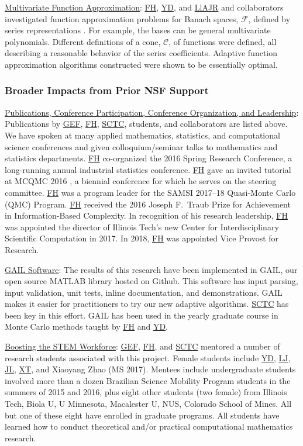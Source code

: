 \documentclass[11pt]{NSFamsart}
\newcommand{\Upara}[1]{\noindent\underline{#1}:\xspace}
\newcommand{\FH}{\hyperlink{FHlink}{FH}\xspace}
\newcommand{\SCTC}{\hyperlink{SCTClink}{SCTC}\xspace}
\newcommand{\GEF}{\hyperlink{GEFlink}{GEF}\xspace}
\newcommand{\YD}{\hyperlink{YDlink}{YD}\xspace}
\newcommand{\LlAJR}{\hyperlink{LlAJRlink}{LlAJR}\xspace}
\newcommand{\LJ}{\hyperlink{LJlink}{LJ}\xspace}
\newcommand{\XT}{\hyperlink{XTlink}{XT}\xspace}
\newcommand{\JL}{\hyperlink{JLlink}{JL}\xspace}
\newcommand{\GAIL}{GAIL\xspace}
\newcommand{\MATLAB}{MATLAB\xspace}
\newcommand{\Rlang}{R\xspace}
\newcommand{\calc}{{\mathcal{C}}}
\newcommand{\calf}{{\mathcal{F}}}
\begin{document}
\Upara{Multivariate Function Approximation}
\FH, \YD, and \LlAJR and collaborators investigated function approximation problems for Banach spaces, $\calf$, defined by series representations \cite{DinHic20a,DinEtal20a}.  For example, the bases can be general multivariate polynomials.  Different definitions of a cone, $\calc$, of functions were defined, all describing a reasonable behavior of the series coefficients.  Adaptive function approximation algorithms constructed were shown to be essentially optimal.


\subsubsection{Broader Impacts from Prior NSF Support} \label{prevBIsect}
\phantom{a}

\Upara{Publications, Conference Participation, Conference Organization, and Leadership} Publications by \GEF, \FH,  \SCTC, students, and collaborators are listed above.  We have spoken at many applied mathematics, statistics,
and computational science conferences and given colloquium/seminar talks to mathematics and
statistics departments.  \FH co-organized the
2016 Spring Research
Conference, a long-running annual industrial statistics conference.   \FH gave an invited tutorial
at MCQMC 2016
\cite{Hic17a}, a biennial conference for which he serves on the steering committee.  \FH
was a program leader for the SAMSI 2017--18 Quasi-Monte Carlo (QMC) Program.   \FH received the 2016 Joseph F.\ Traub Prize for Achievement in Information-Based Complexity. In recognition of his research leadership, \FH was appointed the director of Illinois Tech's new Center for Interdisciplinary
Scientific Computation in 2017.  In 2018, \FH was appointed Vice Provost for Research.

\Upara{\GAIL Software} The results of this research have been implemented in
\GAIL, our open source \MATLAB library hosted on
Github. This software
has input parsing, input validation, unit tests, inline documentation, and
demonstrations.  \GAIL makes it easier for practitioners to try our new adaptive algorithms.  \SCTC has been key in this effort.  \GAIL has been used in the yearly graduate course in Monte Carlo methods taught by \FH and \YD.

\Upara{Boosting the STEM Workforce} \GEF, \FH, and \SCTC mentored a number of
research students associated with this project.  Female students include \YD, \LJ, \JL, \XT, and Xiaoyang Zhao (MS 2017).   Mentees include undergraduate students involved more than a dozen
Brazilian Science Mobility Program students in the summers of 2015 and 2016, plus eight other students (two female) from Illinois Tech, Biola U, U Minnesota, Macalester U, NUS, Colorado School of Mines.  All but one of these eight have enrolled in graduate programs.   All students have learned how to conduct theoretical and/or practical computational mathematics research.
\end{document}
